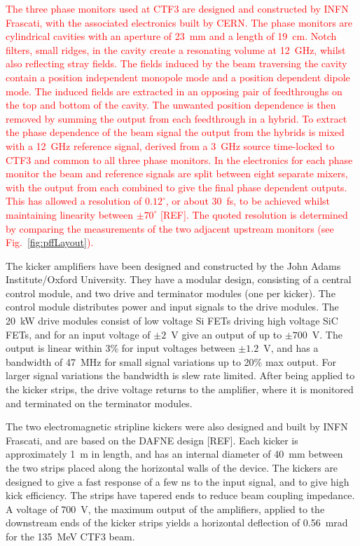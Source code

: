 \documentclass[%
 reprint,
superscriptaddress,
 amsmath,amssymb,
 prl,
]{revtex4-1}
\begin{document}
\textcolor{red}{The three phase monitors used at CTF3 \cite{phMonEuCard} are 
designed and 
constructed by INFN Frascati, with the associated electronics built by CERN. 
The phase monitors are cylindrical cavities with an aperture of 23~mm and a 
length of 19~cm. 
Notch filters, small ridges, in the cavity create a resonating 
volume at 12~GHz, whilst also reflecting stray fields.
The fields induced by the beam traversing the cavity contain a position 
independent monopole mode and a position dependent dipole mode. The induced 
fields are extracted in an opposing pair of feedthroughs on the top and bottom 
of the cavity. The unwanted position dependence is then removed by summing the 
output from each feedthrough in a hybrid. 
To extract the phase dependence of the beam signal the output from the hybrids 
is mixed with a 12~GHz reference signal, derived from a 3~GHz source 
time-locked to CTF3 and common to all three phase monitors.
In the electronics for each phase monitor the beam and reference signals are 
split between eight separate mixers, with the output from each combined to give 
the final phase dependent outputs. This has allowed a resolution of 
\(0.12^\circ\), or about 30~fs, to be achieved whilst maintaining linearity 
between \(\pm70^\circ\) [REF]. The quoted resolution 
is determined by comparing the measurements of the two adjacent upstream 
monitors (see Fig.~\ref{fig:pffLayout}).}

The kicker amplifiers \cite{RobertsThesis} have been designed and constructed 
by the John Adams Institute/Oxford University. They have a modular design, 
consisting of a central control module, and two drive and terminator modules 
(one per kicker). The control module distributes power and input signals to the 
drive modules. The 20~kW drive modules consist of low voltage Si FETs driving 
high voltage SiC FETs, and for an input voltage of \(\pm2\)~V give an output of 
up to \(\pm700\)~V. The output is linear within 3\% for input voltages between 
\(\pm1.2\)~V, and has a bandwidth of 47~MHz for small signal variations up to 
20\% max output. For larger signal variations the bandwidth is slew rate 
limited. After being applied to the kicker strips, the drive voltage returns to 
the amplifier, where it is monitored and terminated on the terminator modules.

The two electromagnetic stripline kickers \cite{kickerIPAC11} were also 
designed and built by INFN Frascati,  and are based on the DAFNE design [REF]. 
Each kicker is approximately 1~m in length, and has an internal diameter of 
40~mm between the two strips placed along the horizontal walls of the device.
The kickers are designed to give a fast response of a few ns to the input 
signal, and to give high kick efficiency. The strips have tapered ends 
to reduce beam coupling impedance.
A voltage of 700~V, the maximum output of the amplifiers, applied to the 
downstream ends of the kicker strips yields a horizontal deflection of 
0.56~mrad for the 135~MeV CTF3 beam.
\end{document}
